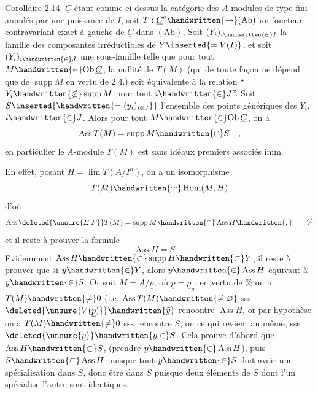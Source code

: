 \uline{Corollaire} 2.14. $\underline C$ étant comme ci-dessus la catégorie des $A$-modules de type fini annulés par une puissance de $I$, soit $T:\underline C^o\handwritten{\to}(\mathrm{Ab})$ un foncteur
contravariant exact à gauche de $\underline C$ dans $(\mathrm{Ab})$, Soit $(Y_i)_{i\handwritten{\in}I}$ la famille des
composantes irréductibles de $Y\inserted{=V(I)}$, et soit $(Y_i)_{i\handwritten{\in}J}$ une sous-famille telle
que pour tout $M\handwritten{\in}\mathrm{Ob}\,\underline C$, la nullité de $T(M)$ (qui de toute façon ne dépend
que de $\operatorname{supp}M$ en vertu de 2.4.) soit équivalente à la relation ``$Y_i\handwritten{\not\subset}
\operatorname{supp}M$ pour tout $i\handwritten{\in}J$''. Soit $S\inserted{\handwritten{=(y_i)_{i\in J}}}$ l'ensemble des points génériques des
$Y_i$, $i\handwritten{\in}J$. Alors pour tout $M\handwritten{\in}\mathrm{Ob}\,\underline C$, on a
\[
\operatorname{Ass}T(M)=\operatorname{supp}M\handwritten{\cap} S\quad,
\]
en particulier le $A$-module $T(M)$ est sans idéaux premiers associés imm.

En effet, posant $H=\lim T(A/I^n)$, on a un isomorphisme
\[
T(M)\handwritten{\simeq}\operatorname{Hom}(M,H)
\]
d'où
\[
\operatorname{Ass}\deleted{\unsure{E|P}}T(M)=\operatorname{supp}M\handwritten{\cap}\operatorname{Ass}H\handwritten{,}\tag*{\%}
\]
et il reste à prouver la formule
\[
\operatorname{Ass}H=S\quad.
\]
 Evidemment $\operatorname{Ass}H\handwritten{\subset}\operatorname{supp}H\handwritten{\subset}Y$, il reste à prouver que si $y\handwritten{\in}Y$,
alors $y\handwritten{\in}\operatorname{Ass}H$ équivaut à $y\handwritten{\in}S$. Or soit $M=A/\underline p$, où $\underline p=\underline p_y$,  en
vertu de \% on a $T(M)\handwritten{\ne}0$ (i.e. $\operatorname{Ass}T(M)\handwritten{\ne\varnothing}$\handwritten{)} sss $\deleted{\unsure{V(\underline p)}}\handwritten{\bar y}$  renoontre  $\operatorname{Ass}H$,
or par hypothèse on a $T(M)\handwritten{\ne}0$ sss   rencontre  $S$,
ou ce qui revient au même, sss $\deleted{\unsure{\underline p}}\handwritten{y\in}S$. Cela prouve d'abord que $\operatorname{Ass}H\handwritten{\subset}S$,
(prendre $y\handwritten{\in}\operatorname{Ass}H$), puis $S\handwritten{\subset}\operatorname{Ass}H$ puisque tout $y\handwritten{\in}S$ doit avoir une
spécialisation dans $S$, donc être dans $S$ puisque deux éléments de $S$ dont
 l'un spécialise l'autre sont identiques.

